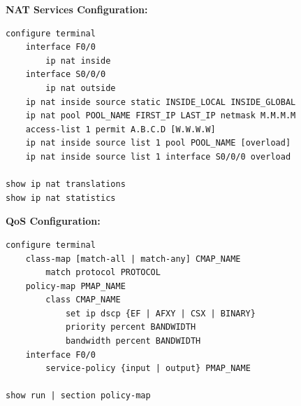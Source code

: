 \documentclass[12pt]{article}
\begin{document}
	\textbf{NAT Services Configuration:}
	\begin{lstlisting}
configure terminal
	interface F0/0
		ip nat inside
	interface S0/0/0
		ip nat outside
	ip nat inside source static INSIDE_LOCAL INSIDE_GLOBAL
	ip nat pool POOL_NAME FIRST_IP LAST_IP netmask M.M.M.M
	access-list 1 permit A.B.C.D [W.W.W.W]
	ip nat inside source list 1 pool POOL_NAME [overload]
	ip nat inside source list 1 interface S0/0/0 overload

show ip nat translations
show ip nat statistics
	\end{lstlisting}

	\textbf{QoS Configuration:}
	\begin{lstlisting}
configure terminal
	class-map [match-all | match-any] CMAP_NAME
		match protocol PROTOCOL
	policy-map PMAP_NAME
		class CMAP_NAME
			set ip dscp {EF | AFXY | CSX | BINARY}
			priority percent BANDWIDTH
			bandwidth percent BANDWIDTH
	interface F0/0
		service-policy {input | output} PMAP_NAME
		
show run | section policy-map
	\end{lstlisting}
\end{document}
